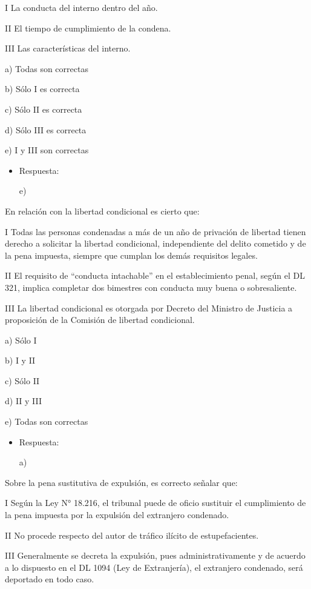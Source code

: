 \documentclass[letterpaper, 11pt]{article}
\begin{document}
I La conducta del interno dentro del año.

II El tiempo de cumplimiento de la condena.

III Las características del interno.


a) Todas son correctas

b) Sólo I es correcta

c) Sólo II es correcta

d) Sólo III es correcta

e) I y III son correctas

\begin{itemize}
\item Respuesta:

e)
\end{itemize}


En relación con la libertad condicional es cierto que:

I Todas las personas condenadas a más de un año de privación de
libertad tienen derecho a solicitar la libertad condicional,
independiente del delito cometido y de la pena impuesta, siempre que
cumplan los demás requisitos legales.

II El requisito de “conducta intachable” en el establecimiento penal,
según el DL 321, implica completar dos bimestres con conducta muy
buena o sobresaliente.

III La libertad condicional es otorgada por Decreto del Ministro de
Justicia a proposición de la Comisión de libertad condicional.

a) Sólo I

b) I y II

c) Sólo II

d) II y III

e) Todas son correctas

\begin{itemize}
\item Respuesta:

a)
\end{itemize}


Sobre la pena sustitutiva de expulsión, es correcto señalar que:

I Según la Ley N° 18.216, el tribunal puede de oficio sustituir el
cumplimiento de la pena impuesta por la expulsión del extranjero
condenado.

II No procede respecto del autor de tráfico ilícito de
estupefacientes.

III Generalmente se decreta la expulsión, pues administrativamente y
de acuerdo a lo dispuesto en el DL 1094 (Ley de Extranjería), el
extranjero condenado, será deportado en todo caso.
\end{document}
